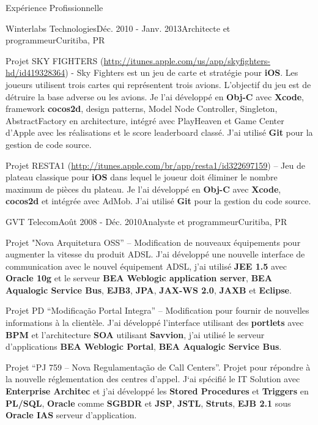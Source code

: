 \documentclass{resume}
\begin{document}
\begin{rSection}{Expérience Profissionnelle}
\begin{rSubsection}{Winterlabs Technologies}{Déc. 2010 - Janv. 2013}{Architecte et programmeur}{Curitiba, PR}
    \item Projet SKY FIGHTERS (\url{http://itunes.apple.com/us/app/skyfighters-hd/id419328364}) - Sky Fighters est un jeu de carte et stratégie pour \textbf{iOS}. Les joueurs utilisent trois cartes qui représentent trois avions. L'objectif du jeu est de détruire la base adverse ou les avions. Je l’ai développé en \textbf{Obj-C} avec \textbf{Xcode}, framework \textbf{cocos2d}, design patterns, Model Node Controller, Singleton, AbstractFactory en architecture, intégré avec PlayHeaven et Game Center d'Apple avec les réalisations et le score leaderboard classé. J’ai utilisé \textbf{Git} pour la gestion de code source. \\
    \item Projet RESTA1 (\url{http://itunes.apple.com/br/app/resta1/id322697159}) – Jeu de plateau classique pour \textbf{iOS} dans lequel le joueur doit éliminer le nombre maximum de pièces du plateau. Je l’ai développé en \textbf{Obj-C} avec \textbf{Xcode}, \textbf{cocos2d} et intégrée avec AdMob. J’ai utilisé \textbf{Git} pour la gestion du code source.
    \end{rSubsection}
    \begin{rSubsection}{GVT Telecom}{Août 2008 - Déc. 2010}{Analyste et programmeur}{Curitiba, PR}
    \item Projet "Nova Arquitetura OSS” – Modification de nouveaux équipements pour augmenter la vitesse du produit ADSL. J'ai développé une nouvelle interface de communication avec le nouvel équipement ADSL, j'ai utilisé \textbf{JEE 1.5} avec \textbf{Oracle 10g} et le serveur \textbf{BEA Weblogic application server}, \textbf{BEA Aqualogic Service Bus}, \textbf{EJB3}, \textbf{JPA}, \textbf{JAX-WS 2.0}, \textbf{JAXB} et \textbf{Eclipse}.\\
    \item Projet PD “Modificação Portal Integra” – Modification pour fournir de nouvelles informations à la clientèle. J'ai développé l'interface  utilisant des \textbf{portlets} avec \textbf{BPM} et l'architecture \textbf{SOA} utilisant \textbf{Savvion}, j'ai utilisé le serveur d'applications \textbf{BEA Weblogic Portal}, \textbf{BEA Aqualogic Service Bus}.\\
    \item Projet “PJ 759 – Nova Regulamentação de Call Centers”. Projet pour répondre à la nouvelle réglementation des centres d'appel. J‘ai spécifié le IT Solution avec \textbf{Enterprise Architec} et j'ai développé les \textbf{Stored Procedures} et \textbf{Triggers} en \textbf{PL/SQL}, \textbf{Oracle} comme \textbf{SGBDR} et \textbf{JSP}, \textbf{JSTL}, \textbf{Struts}, \textbf{EJB 2.1} sous \textbf{Oracle IAS} serveur d'application.\\

\end{rSubsection}
\end{rSection}
\end{document}
